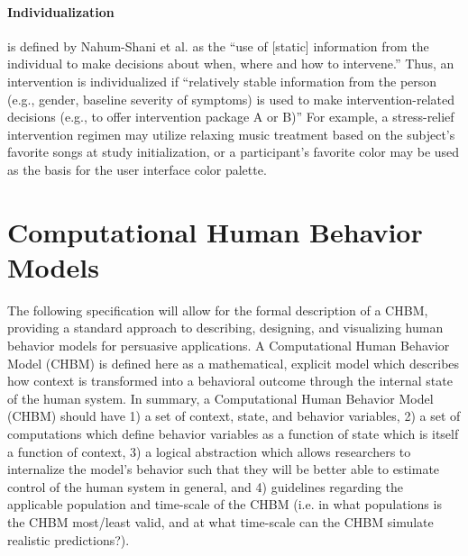 \documentclass[runningheads,a4paper]{llncs}
\begin{document}
\paragraph{Individualization} is defined by Nahum-Shani et al. as the ``use of [static] information from the individual to make decisions about when, where and how to intervene.'' \cite{nahum2014}
Thus, an intervention is individualized if ``relatively stable information from the person (e.g., gender, baseline severity of symptoms) is used to make intervention-related decisions (e.g., to offer intervention package A or B)'' \cite{nahum2014}
For example, a stress-relief intervention regimen may utilize relaxing music treatment based on the subject's favorite songs at study initialization, or a participant's favorite color may be used as the basis for the user interface color palette.


\section{Computational Human Behavior Models}
The following specification will allow for the formal description of a CHBM, providing a standard approach to describing, designing, and visualizing human behavior models for persuasive applications.
A Computational Human Behavior Model (CHBM) is defined here as a mathematical, explicit model which describes how context is transformed into a behavioral outcome through the internal state of the human system.
In summary, a Computational Human Behavior Model (CHBM) should have 1) a set of context, state, and behavior variables, 2) a set of computations which define behavior variables as a function of state which is itself a function of context, 3) a logical abstraction which allows researchers to internalize the model's behavior such that they will be better able to estimate control of the human system in general, and 4) guidelines regarding the applicable population and time-scale of the CHBM (i.e. in what populations is the CHBM most/least valid, and at what time-scale can the CHBM simulate realistic predictions?).
\end{document}

